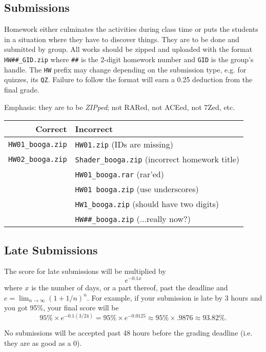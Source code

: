 \documentclass[10pt]{article}
\begin{document}
\subsection{Submissions}
Homework either culminates the activities during class time or puts the students in a situation where they have to discover things. They are to be done and submitted by group. All works should be zipped and uploaded with the format \verb|HW##_GID.zip| where \verb!##! is the 2-digit homework number and \verb!GID! is the group's handle. The \verb|HW| prefix may change depending on the submission type, e.g. for quizzes, its \verb|QZ|. Failure to follow the format will earn a 0.25 deduction from the final grade.

Emphasis: they are to be \emph{ZIPped}; not RARed, not ACEed, not 7Zed, etc.

\begin{center}
\begin{tabular}{r|l}
Correct & Incorrect\\
\hline
\verb|HW01_booga.zip| & \verb|HW01.zip| (IDs are missing)\\
\verb|HW02_booga.zip| & \verb|Shader_booga.zip| (incorrect homework title)\\
 & \verb|HW01_booga.rar| (rar'ed)\\
 & \verb|HW01 booga.zip| (use underscores)\\
 & \verb|HW1_booga.zip| (should have two digits)\\
 & \verb|HW##_booga.zip| (...really now?)
\end{tabular}
\end{center}

\subsection{Late Submissions}
The score for late submissions will be multiplied by
$$
e^{-0.1x}
$$
where $x$ is the number of days, or a part thereof, past the deadline and $e = \lim_{n\rightarrow\infty}(1 + 1/n)^n$. For example, if your submission is late by 3 hours and you got 95\%, your final score will be
$$
95\% \times e^{-0.1(3/24)} = 95\% \times e^{-0.0125} \approx 95\% \times .9876 \approx 93.82\%.
$$

No submissions will be accepted past 48 hours before the grading deadline (i.e. they are as good as a 0).
\end{document}
